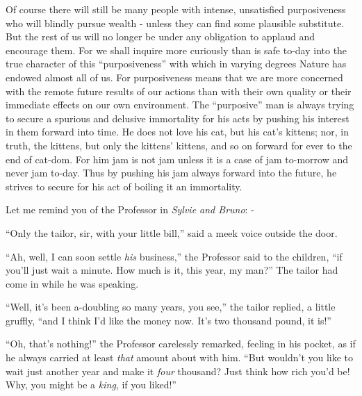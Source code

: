 Of course there will still be many people with intense, unsatisfied purposiveness who will blindly pursue wealth - unless they can find some plausible substitute. But the rest of us will no longer be under any obligation to applaud and encourage them. For we shall inquire more curiously than is safe to-day into the true character of this “purposiveness” with which in varying degrees Nature has endowed almost all of us. For purposiveness means that we are more concerned with the remote future results of our actions than with their own quality or their immediate effects on our own environment. The “purposive” man is always trying to secure a spurious and delusive immortality for his acts by pushing his interest in them forward into time. He does not love his cat, but his cat’s kittens; nor, in truth, the kittens, but only the kittens’ kittens, and so on forward for ever to the end of cat-dom. For him jam is not jam unless it is a case of jam to-morrow and never jam to-day. Thus by pushing his jam always forward into the future, he strives to secure for his act of boiling it an immortality.\par

Let me remind you of the Professor in \textit{Sylvie and Bruno}: -\par

\begin{rquote}
“Only the tailor, sir, with your little bill,” said a meek voice outside the door.
\end{rquote}

\begin{rquote}
“Ah, well, I can soon settle \textit{his} business,” the Professor said to the children, “if you’ll just wait a minute. How much is it, this year, my man?” The tailor had come in while he was speaking.
\end{rquote}

\begin{rquote}
“Well, it’s been a-doubling so many years, you see,” the tailor replied, a little gruffly, “and I think I’d like the money now. It’s two thousand pound, it is!”
\end{rquote}

\begin{rquote}
“Oh, that’s nothing!” the Professor carelessly remarked, feeling in his pocket, as if he always carried at least \textit{that} amount about with him. “But wouldn’t you like to wait just another year and make it \textit{four} thousand? Just think how rich you’d be! Why, you might be a \textit{king}, if you liked!”
\end{rquote}

